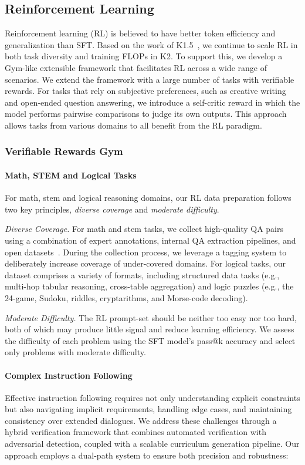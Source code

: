 \subsection{Reinforcement Learning}
Reinforcement learning (RL) is believed to have better token efficiency and generalization than SFT.
Based on the work of K1.5~\citep{team2025kimi}, we continue to scale RL in both task diversity and training FLOPs in K2. To support this, we develop a Gym-like extensible framework that facilitates RL across a wide range of scenarios. We extend the framework with a large number of tasks with verifiable rewards. For tasks that rely on subjective preferences, such as creative writing and open-ended question answering, we introduce a self-critic reward in which the model performs pairwise comparisons to judge its own outputs. This approach allows tasks from various domains to all benefit from the RL paradigm. 

\subsubsection{Verifiable Rewards Gym}

\paragraph{Math, STEM and Logical Tasks}
For math, stem and logical reasoning domains, our RL data preparation follows two key principles, \emph{diverse coverage} and \emph{moderate difficulty}.

\emph{Diverse Coverage.} 
For math and stem tasks, we collect high-quality QA pairs using a combination of expert annotations, internal QA extraction pipelines, and open datasets~\citep{li2024numinamath,moshkov2025aimo}. During the collection process, we leverage a tagging system to deliberately increase coverage of under-covered domains. For logical tasks, our dataset comprises a variety of formats, including structured data tasks (e.g., multi-hop tabular reasoning, cross-table aggregation) and logic puzzles (e.g., the 24-game, Sudoku, riddles, cryptarithms, and Morse-code decoding).

\emph{Moderate Difficulty.} The RL prompt-set should be neither too easy nor too hard, both of which may produce little signal and reduce learning efficiency. We assess the difficulty of each problem using the SFT model's pass@k accuracy and select only problems with moderate difficulty.



\paragraph{Complex Instruction Following}
Effective instruction following requires not only understanding explicit constraints but also navigating implicit requirements, handling edge cases, and maintaining consistency over extended dialogues. We address these challenges through a hybrid verification framework that combines automated verification with adversarial detection, coupled with a scalable curriculum generation pipeline.
Our approach employs a dual-path system to ensure both precision and robustness:

